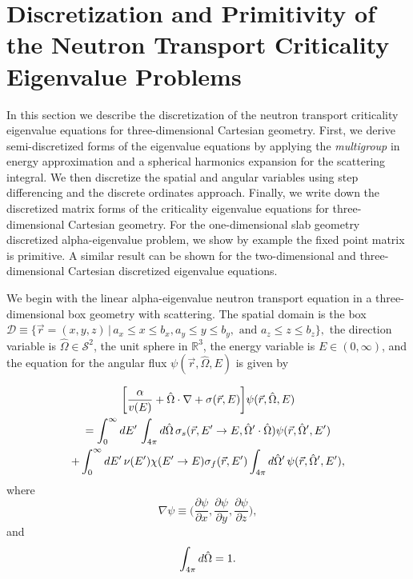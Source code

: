 \chapter{Discretization and Primitivity of the Neutron Transport Criticality Eigenvalue Problems}

In this section we describe the discretization of the neutron transport criticality eigenvalue equations for three-dimensional Cartesian geometry. First, we derive semi-discretized forms of the eigenvalue equations by applying the \textit{multigroup} in energy approximation and a spherical harmonics expansion for the scattering integral. We then discretize the spatial and angular variables using step differencing and the discrete ordinates approach. Finally, we write down the discretized matrix forms of the criticality eigenvalue equations for three-dimensional Cartesian geometry. For the one-dimensional slab geometry discretized alpha-eigenvalue problem, we show by example the fixed point matrix is primitive. A similar result can be shown for the two-dimensional and three-dimensional Cartesian discretized eigenvalue equations.

We begin with the linear alpha-eigenvalue neutron transport equation in a three-dimensional box geometry with scattering. The spatial domain is the box $\mathcal{D} \equiv \{\vec{r} = (x, y, z) \, \vert \, a_{x} \leq x \leq b_{x}, a_{y} \leq y \leq b_{y}, \text{ and } a_{z} \leq z \leq b_{z} \},$ the direction variable is $\hat{\Omega} \in \mathcal{S}^{2}$, the unit sphere in $\mathbb{R}^{3}$, the energy variable is $E \in (0, \infty)$, and the equation for the angular flux $\psi(\vec{r}, \hat{\Omega}, E)$ is given by

\begin{multline}
	\bigg [ \frac{\alpha}{v(E)} + \hat{\Omega} \cdot \nabla + \sigma(\vec{r},E) \bigg ] \psi(\vec{r},\hat{\Omega},E) \\ = \int_{0}^{\infty} \mathop{}\!d E' \, \int_{4\pi} \mathop{}\!d \hat{\Omega} \, \sigma_{s}(\vec{r},E'\rightarrow E,\hat{\Omega}' \cdot \hat{\Omega}) \psi(\vec{r},\hat{\Omega}',E') \\ + \int_{0}^{\infty} \mathop{}\!d E' \, \nu(E') \chi(E'\rightarrow E) \sigma_{f}(\vec{r},E') \int_{4\pi} \mathop{}\!d \hat{\Omega}' \, \psi(\vec{r},\hat{\Omega}',E'), 
	\label{eq:Alpha3DNeutronTransport}
\end{multline}
where
\begin{equation}
	\nabla \psi \equiv \bigg (\frac{\partial \psi}{\partial x}, \frac{\partial \psi}{\partial y}, \frac{\partial \psi}{\partial z} \bigg ),
\end{equation}
and
\begin{equation}
	 \int_{4\pi} \mathop{}\!d \hat{\Omega} = 1.
\end{equation}

